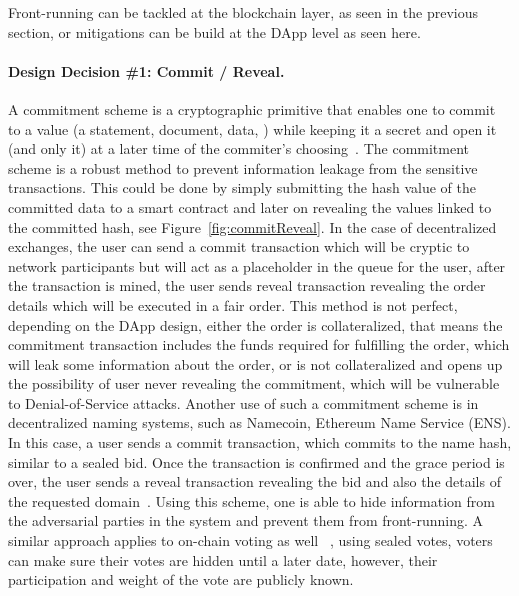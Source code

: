 Front-running can be tackled at the blockchain layer, as seen in the previous section, or mitigations can be build at the DApp level as seen here. 

\paragraph{Design Decision \#1: Commit / Reveal.} \label{CommitmentScheme}
A commitment scheme is a cryptographic primitive that enables one to commit to a value (\eg a statement, document, data, \etc) while keeping it a secret and open it (and only it) at a later time of the commiter's choosing~\cite{brassard1988minimum}. The commitment scheme is a robust method to prevent information leakage from the sensitive transactions. This could be done by simply submitting the hash value of the committed data to a smart contract and later on revealing the values linked to the committed hash, see Figure~\ref{fig:commitReveal}. 
In the case of decentralized exchanges, the user can send a commit transaction which will be cryptic to network participants but will act as a placeholder in the queue for the user, after the transaction is mined, the user sends reveal transaction revealing the order details which will be executed in a fair order. This method is not perfect, depending on the DApp design, either the order is collateralized, that means the commitment transaction includes the funds required for fulfilling the order, which will leak some information about the order, or is not collateralized and opens up the possibility of user never revealing the commitment, which will be vulnerable to Denial-of-Service attacks. 
Another use of such a commitment scheme is in decentralized naming systems, such as Namecoin, Ethereum Name Service (ENS). In this case, a user sends a commit transaction, which commits to the name hash, similar to a sealed bid. Once the transaction is confirmed and the grace period is over, the user sends a reveal transaction revealing the bid and also the details of the requested domain~\cite{kalodner2015empirical}. Using this scheme, one is able to hide information from the adversarial parties in the system and prevent them from front-running. A similar approach applies to on-chain voting as well ~\cite{adChainPLCRVoting}, using sealed votes, voters can make sure their votes are hidden until a later date, however, their participation and weight of the vote are publicly known. 
